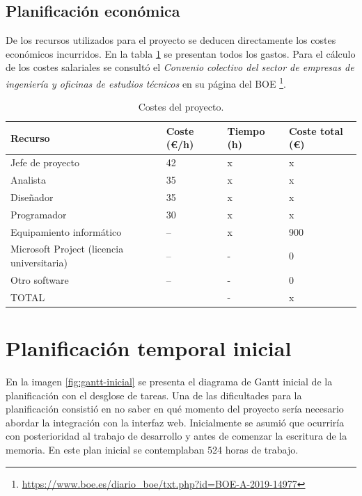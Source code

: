 \subsection{Planificación económica}

De los recursos utilizados para el proyecto se deducen directamente los costes económicos incurridos. En la tabla \ref{tab:costes-proyecto} se presentan todos los gastos. Para el cálculo de los costes salariales se consultó el \emph{Convenio colectivo del sector de empresas de ingeniería y oficinas de estudios técnicos} en su página del BOE \footnote{\url{https://www.boe.es/diario_boe/txt.php?id=BOE-A-2019-14977}}.

\begin{table}[ht]
    \centering
    \begin{tabular}{l l l l}
        Recurso & Coste (€/h) & Tiempo (h) & Coste total (€) \\
        \hline
        \hline
        Jefe de proyecto & 42 & x & x \\
        Analista & 35 & x & x \\
        Diseñador & 35 & x & x \\
        Programador & 30 & x & x \\
        Equipamiento informático & -- & x & 900 \\
        Microsoft Project (licencia universitaria) & -- & - & 0 \\
		Otro software & -- & - & 0 \\    
        \hline
        \hline
        TOTAL & & - & x \\        
    \end{tabular}
	\caption{Costes del proyecto.}    
	\label{tab:costes-proyecto}
\end{table}

\section{Planificación temporal inicial}

En la imagen \ref{fig:gantt-inicial} se presenta el diagrama de Gantt inicial de la planificación con el desglose de tareas. Una de las dificultades para la planificación consistió en no saber en qué momento del proyecto sería necesario abordar la integración con la interfaz web. Inicialmente se asumió que ocurriría con posterioridad al trabajo de desarrollo y antes de comenzar la escritura de la memoria. En este plan inicial se contemplaban 524 horas de trabajo.

